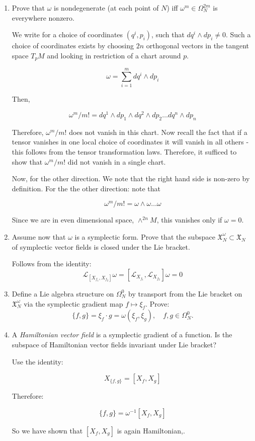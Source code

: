 \begin{enumerate}
    \item[(a)] Prove that $\omega$ is nondegenerate (at each point of $N$) iff $\omega^m \in \Omega^{2m}_N$ is everywhere nonzero.

    We write for a choice of coordinates $(q^{i}, p_{i})$, such that $dq^{i} \wedge dp_{i} \neq 0$. Such a choice of coordinates exists by choosing $2n$ orthogonal vectors in the tangent space $T_{p} M$ and looking in restriction of a chart around $p$. 

    $$\omega = \sum_{i = 1}^{m} dq^{i} \wedge dp_{i}$$

    Then, 

    $$\omega^{m}/m! = dq^{1} \wedge dp_{1} \wedge dq^{2} \wedge dp_{2} \dots dq^{n} \wedge dp_{n}$$

    Therefore, $\omega^{m}/m!$ does not vanish in this chart. Now recall the fact that if a tensor vanishes in one local choice of coordinates it will vanish in all others - this follows from the tensor transformation laws. Therefore, it sufficed to show that $\omega^{m}/m!$ did not vanish in a single chart. 
    
    Now, for the other direction. We note that the right hand side is non-zero by definition. For the the other direction: note that 

    $$\omega^{m}/m! = \omega \wedge \omega \dots \omega$$

    Since we are in even dimensional space, $\wedge^{2n} M$, this vanishes only if $\omega = 0$. 

    \item[(b)] Assume now that $\omega$ is a symplectic form. Prove that the subspace $\mathfrak{X}^\omega_N \subset \mathfrak{X}_N$ of symplectic vector fields is closed under the Lie bracket.

    Follows from the identity: $$\mathcal{L}_{[X_{f_{1}}, X_{f_{2}}]} \omega = [\mathcal{L}_{X_{f_{1}}}, \mathcal{L}_{X_{f_{2}}}] \omega = 0$$
    \item[(c)] Define a Lie algebra structure on $\Omega^0_N$ by transport from the Lie bracket on $\mathfrak{X}^\omega_N$ via the symplectic gradient map $f \mapsto \xi_f$. Prove:
    \[
    \{f, g\} = \xi_f \cdot g = \omega(\xi_f, \xi_g), \quad f, g \in \Omega^0_N.
    \]


    \item[(d)] A \emph{Hamiltonian vector field} is a symplectic gradient of a function. Is the subspace of Hamiltonian vector fields invariant under Lie bracket?

    Use the identity:

    $$X_{\{f,g\}} = [X_{f}, X_{g}]$$

    Therefore:

    $$\{f, g \} = \omega ^{-1} [X_{f}, X_{g}]$$

    So we have shown that $[X_{f}, X_{g}]$ is again Hamiltonian,. 
    
\end{enumerate}


